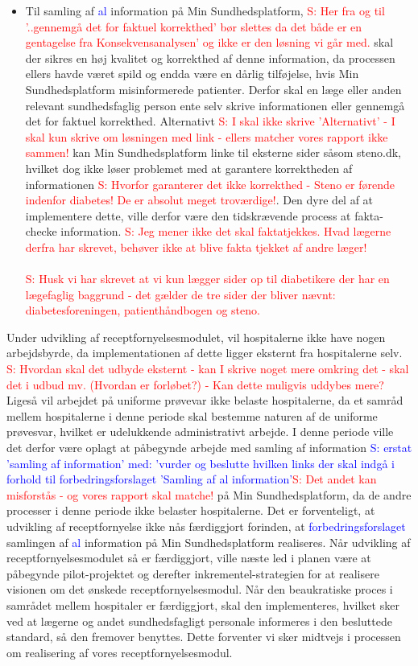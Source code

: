 \begin{itemize}
{}
	\item Til samling af 
	\textcolor{blue}{al} information på Min Sundhedsplatform, \textcolor{red}{S: Her fra og til '..gennemgå det for faktuel korrekthed' bør slettes da det både er en gentagelse fra Konsekvensanalysen' og ikke er den løsning vi går med.} skal der sikres en høj kvalitet og korrekthed af denne information, da processen ellers havde været spild og endda være en dårlig tilføjelse, hvis Min Sundhedsplatform misinformerede patienter. Derfor skal en læge eller anden relevant sundhedsfaglig person ente selv skrive informationen eller gennemgå det for faktuel korrekthed. Alternativt \textcolor{red}{S: I skal ikke skrive 'Alternativt' - I skal kun skrive om løsningen med link - ellers matcher vores rapport ikke sammen!}  kan Min Sundhedsplatform linke til eksterne sider såsom steno.dk, hvilket dog ikke løser problemet med at garantere korrektheden af informationen
	\textcolor{red}{S: Hvorfor garanterer det ikke korrekthed - Steno er førende indenfor diabetes! De er absolut meget troværdige!}. Den dyre del af at implementere dette, ville derfor være den tidskrævende process at fakta-checke information.
	\textcolor{red}{S: Jeg mener ikke det skal faktatjekkes. Hvad lægerne derfra har skrevet, behøver ikke at blive fakta tjekket af andre læger!
	}
\textcolor{red}{\\\\S: Husk vi har skrevet at vi kun lægger sider op til diabetikere der har en lægefaglig baggrund - det gælder de tre sider der bliver nævnt: diabetesforeningen, patienthåndbogen og steno.}
\end{itemize}
Under udvikling af receptfornyelsesmodulet, vil hospitalerne ikke have nogen arbejdsbyrde, da implementationen af dette ligger eksternt fra hospitalerne selv.
\textcolor{red}{S: Hvordan skal det udbyde eksternt - kan I skrive noget mere omkring det - skal det i udbud mv. (Hvordan er forløbet?) - Kan dette muligvis uddybes mere?} Ligeså vil arbejdet på uniforme prøvevar ikke belaste hospitalerne, da et samråd mellem hospitalerne i denne periode skal bestemme naturen af de uniforme prøvesvar, hvilket er udelukkende administrativt arbejde. I denne periode ville det derfor være oplagt at påbegynde arbejde med samling af information
\textcolor{blue}{S: erstat 'samling af information' med: 'vurder og beslutte hvilken links der skal indgå i forhold til forbedringsforslaget 'Samling af al information'}\textcolor{red}{S: Det andet kan misforstås - og vores rapport skal matche!}
 på Min Sundhedsplatform, da de andre processer i denne periode ikke belaster hospitalerne. Det er forventeligt, at udvikling af receptfornyelse ikke nås færdiggjort forinden, at \textcolor{blue}{forbedringsforslaget} samlingen af \textcolor{blue}{al} information på Min Sundhedsplatform realiseres. Når udvikling af receptfornyelsesmodulet så er færdiggjort, ville næste led i planen være at påbegynde pilot-projektet og derefter inkrementel-strategien for at realisere visionen om det ønskede receptfornyelsesmodul.
Når den beaukratiske proces i samrådet mellem hospitaler er færdiggjort, skal den implementeres, hvilket sker ved at lægerne og andet sundhedsfagligt personale informeres i den besluttede standard, så den fremover benyttes. Dette forventer vi sker midtvejs i processen om realisering af vores receptfornyelsesmodul.
